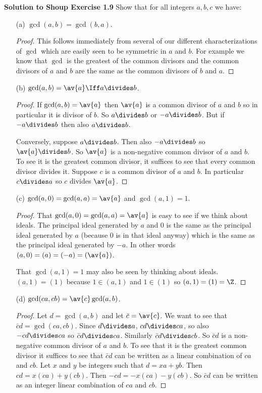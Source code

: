 \documentclass[oneside,12pt]{amsart}
\begin{document}
\textbf{Solution to Shoup Exercise 1.9} Show that for all integers $a,b,c$ we have:
\begin{enumerate}
\item[(a)] $\gcd(a,b)=\gcd(b,a)$.
\begin{proof}
This follows immediately from several of our different characterizations of $\gcd$ which are easily seen to be symmetric in $a$ and $b$. For example we know that $\gcd$ is the greatest of the common divisors and the common divisors of $a$ and $b$ are the same as the common divisors of $b$ and $a$.
\end{proof}

\item[(b)] $\gcd(a,b) = \av{a} \Iff a\divides b$.
\begin{proof}
If $\gcd(a,b) = \av{a}$ then $\av{a}$ is a common divisor of $a$ and $b$
so in particular it is divisor of $b$. So $a\divides b$ or $-a\divides b$. But if $-a\divides b$ then also $a\divides b$.

Conversely, suppose $a\divides b$. Then also $-a\divides b$ so $\av{a} \divides b$. So $\av{a}$ is a non-negative common divisor of $a$ and $b$. To see it is the greatest common divisor, it suffices to see that every common
divisor divides it. Suppose $c$ is a common divisor of $a$ and $b$. In 
particular $c\divides a$ so $c$ divides $\av{a}$.
\end{proof}

\item[(c)] $\gcd(a,0)=\gcd(a,a) = \av{a}$ and $\gcd(a,1) = 1$.
\begin{proof}
That $\gcd(a,0)=\gcd(a,a) = \av{a}$ is easy to see if we think about ideals.
The principal ideal generated by $a$ and $0$ is the same as the principal
ideal generated by $a$ (because 0 is in that ideal anyway) which is the
same as the principal ideal generated by $-a$. In other words
$(a,0)=(a)=(-a) = (\av{a})$.

That $\gcd(a,1)=1$ may also be seen by thinking about ideals.
$(a,1) = (1)$ because $1\in (a,1)$ and $1\in (1)$ so $(a,1)=(1)=\Z$.
\end{proof}

\item[(d)] $\gcd(ca,cb) = \av{c} \gcd(a,b)$.
\begin{proof}
Let $d=\gcd(a,b)$ and let $\bar{c}=\av{c}$. We want to see that $\bar{c}d=\gcd(ca,cb)$. Since $d\divides a$, $cd \divides ca$, so also $-cd \divides ca$ so $\bar{c}d\divides ca$. Similarly $\bar{c}d \divides cb$. So $\bar{c}d$ is a non-negative
common divisor of $a$ and $b$. To see that it is the greatest common divisor
it suffices to see that $\bar{c}d$ can be written as a linear combination
of $ca$ and $cb$. Let $x$ and $y$ be integers such that $d=xa+yb$.
Then $cd=x(ca) + y(cb)$. Then $-cd=-x(ca) -y(cb)$. So $\bar{c}d$ can
be written as an integer linear combination of $ca$ and $cb$.
\end{proof}
\end{enumerate}
\end{document}
